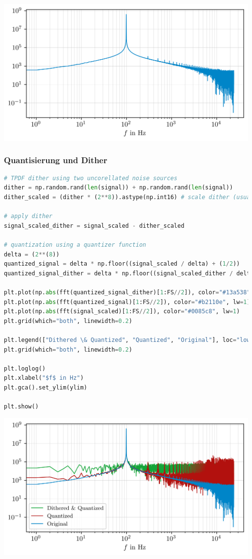\includegraphics{./img/de9c4c704937869e21407a577db0ca1c99eb2ed8.png}

\hypertarget{quantisierung-und-dither}{%
\subsubsection{Quantisierung und
Dither}\label{quantisierung-und-dither}}

\begin{lstlisting}[language=Python]
# TPDF dither using two uncorellated noise sources
dither = np.random.rand(len(signal)) + np.random.rand(len(signal))
dither_scaled = (dither * (2**8)).astype(np.int16) # scale dither (usually only to 1 LSB)

# apply dither
signal_scaled_dither = signal_scaled - dither_scaled

# quantization using a quantizer function
delta = (2**(8))
quantized_signal = delta * np.floor((signal_scaled / delta) + (1/2))
quantized_signal_dither = delta * np.floor((signal_scaled_dither / delta) + (1/2))

plt.plot(np.abs(fft(quantized_signal_dither)[1:FS//2]), color="#13a538", lw=1)
plt.plot(np.abs(fft(quantized_signal)[1:FS//2]), color="#b2110e", lw=1)
plt.plot(np.abs(fft(signal_scaled)[1:FS//2]), color="#0085c8", lw=1)
plt.grid(which="both", linewidth=0.2)

plt.legend(["Dithered \& Quantized", "Quantized", "Original"], loc="lower left", fontsize="small")
plt.grid(which="both", linewidth=0.2)

plt.loglog()
plt.xlabel("$f$ in Hz")
plt.gca().set_ylim(ylim)

plt.show()
\end{lstlisting}

\includegraphics{./img/c64125e6cae2537b28f868d10f27a05614a96351.png}

